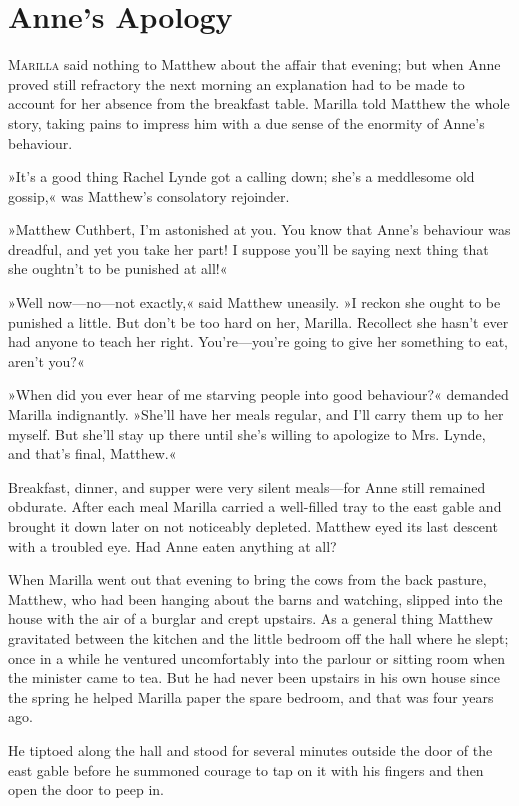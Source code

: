 \chapter{Anne’s Apology}

\lettrine[lines=4]{M}{arilla} said nothing to Matthew about the affair that evening; but when Anne proved still refractory the next morning an explanation had to be made to account for her absence from the breakfast table. Marilla told Matthew the whole story, taking pains to impress him with a due sense of the enormity of Anne’s behaviour.

»It’s a good thing Rachel Lynde got a calling down; she’s a meddlesome old gossip,« was Matthew’s consolatory rejoinder.

»Matthew Cuthbert, I’m astonished at you. You know that Anne’s behaviour was dreadful, and yet you take her part! I suppose you’ll be saying next thing that she oughtn’t to be punished at all!«

»Well now—no—not exactly,« said Matthew uneasily. »I reckon she ought to be punished a little. But don’t be too hard on her, Marilla. Recollect she hasn’t ever had anyone to teach her right. You’re—you’re going to give her something to eat, aren’t you?«

»When did you ever hear of me starving people into good behaviour?« demanded Marilla indignantly. »She’ll have her meals regular, and I’ll carry them up to her myself. But she’ll stay up there until she’s willing to apologize to Mrs. Lynde, and that’s final, Matthew.«

Breakfast, dinner, and supper were very silent meals—for Anne still remained obdurate. After each meal Marilla carried a well-filled tray to the east gable and brought it down later on not noticeably depleted. Matthew eyed its last descent with a troubled eye. Had Anne eaten anything at all?

When Marilla went out that evening to bring the cows from the back pasture, Matthew, who had been hanging about the barns and watching, slipped into the house with the air of a burglar and crept upstairs. As a general thing Matthew gravitated between the kitchen and the little bedroom off the hall where he slept; once in a while he ventured uncomfortably into the parlour or sitting room when the minister came to tea. But he had never been upstairs in his own house since the spring he helped Marilla paper the spare bedroom, and that was four years ago.

He tiptoed along the hall and stood for several minutes outside the door of the east gable before he summoned courage to tap on it with his fingers and then open the door to peep in.

